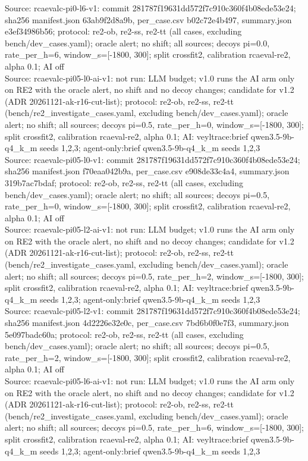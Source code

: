 \begin{table}[t]
Source: rcaevalc-pi0-l6-v1: commit 281787f19631dd572f7c910c360f4b08ede53e24; sha256 manifest.json 63ab9f2d8a9b, per\_case.csv b02c72e4b497, summary.json e3ef34986b56; protocol: re2-ob, re2-ss, re2-tt (all cases, excluding bench/dev\_cases.yaml); oracle alert; no shift; all sources; decoys pi=0.0, rate\_per\_h=6, window\_s=[-1800, 300]; split crossfit2, calibration rcaeval-re2, alpha 0.1; AI off\\
Source: rcaevalc-pi05-l0-ai-v1: not run: LLM budget; v1.0 runs the AI arm only on RE2 with the oracle alert, no shift and no decoy changes; candidate for v1.2 (ADR 20261121-ak-r16-cut-list); protocol: re2-ob, re2-ss, re2-tt (bench/re2\_investigate\_cases.yaml, excluding bench/dev\_cases.yaml); oracle alert; no shift; all sources; decoys pi=0.5, rate\_per\_h=0, window\_s=[-1800, 300]; split crossfit2, calibration rcaeval-re2, alpha 0.1; AI: veyltrace:brief qwen3.5-9b-q4\_k\_m seeds 1,2,3; agent-only:brief qwen3.5-9b-q4\_k\_m seeds 1,2,3\\
Source: rcaevalc-pi05-l0-v1: commit 281787f19631dd572f7c910c360f4b08ede53e24; sha256 manifest.json f70eaa042b9a, per\_case.csv e908de33c4a4, summary.json 319b7ac7bdaf; protocol: re2-ob, re2-ss, re2-tt (all cases, excluding bench/dev\_cases.yaml); oracle alert; no shift; all sources; decoys pi=0.5, rate\_per\_h=0, window\_s=[-1800, 300]; split crossfit2, calibration rcaeval-re2, alpha 0.1; AI off\\
Source: rcaevalc-pi05-l2-ai-v1: not run: LLM budget; v1.0 runs the AI arm only on RE2 with the oracle alert, no shift and no decoy changes; candidate for v1.2 (ADR 20261121-ak-r16-cut-list); protocol: re2-ob, re2-ss, re2-tt (bench/re2\_investigate\_cases.yaml, excluding bench/dev\_cases.yaml); oracle alert; no shift; all sources; decoys pi=0.5, rate\_per\_h=2, window\_s=[-1800, 300]; split crossfit2, calibration rcaeval-re2, alpha 0.1; AI: veyltrace:brief qwen3.5-9b-q4\_k\_m seeds 1,2,3; agent-only:brief qwen3.5-9b-q4\_k\_m seeds 1,2,3\\
Source: rcaevalc-pi05-l2-v1: commit 281787f19631dd572f7c910c360f4b08ede53e24; sha256 manifest.json 4d2226e32e0c, per\_case.csv 7bd6b0f0e7f3, summary.json 5e097badc60a; protocol: re2-ob, re2-ss, re2-tt (all cases, excluding bench/dev\_cases.yaml); oracle alert; no shift; all sources; decoys pi=0.5, rate\_per\_h=2, window\_s=[-1800, 300]; split crossfit2, calibration rcaeval-re2, alpha 0.1; AI off\\
Source: rcaevalc-pi05-l6-ai-v1: not run: LLM budget; v1.0 runs the AI arm only on RE2 with the oracle alert, no shift and no decoy changes; candidate for v1.2 (ADR 20261121-ak-r16-cut-list); protocol: re2-ob, re2-ss, re2-tt (bench/re2\_investigate\_cases.yaml, excluding bench/dev\_cases.yaml); oracle alert; no shift; all sources; decoys pi=0.5, rate\_per\_h=6, window\_s=[-1800, 300]; split crossfit2, calibration rcaeval-re2, alpha 0.1; AI: veyltrace:brief qwen3.5-9b-q4\_k\_m seeds 1,2,3; agent-only:brief qwen3.5-9b-q4\_k\_m seeds 1,2,3\\

\end{table}
